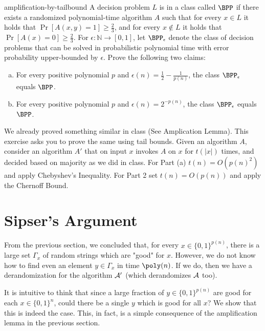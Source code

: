 \begin{exercise-prob}
\begin{show-ps1}{amplification-by-tailbound}
A decision problem $L$ is in a class called $\BPP$ if there exists a randomized polynomial-time algorithm $A$ such that for every $x \in L$ it holds that $\Pr[A(x,y) = 1] \ge \frac{2}{3}$, and for every $x \notin L$ it holds that $\Pr[A(x) = 0] \ge \frac{2}{3}$. For $\epsilon : \mathbb{N} \to [0,1]$, let $\BPP_{\epsilon}$ denote the class of decision problems that can be solved in probabilistic polynomial time with error probability upper-bounded by $\epsilon$. Prove the following two claims:
\begin{enumerate}[(a)]
\item 
For every positive polynomial $p$ and $\epsilon(n) = \frac{1}{2}-\frac{1}{p(n)}$, 
the class $\BPP_{\epsilon}$ equals $\BPP$.
\item For every positive polynomial $p$ and $\epsilon(n) = 2^{-p(n)}$, 
the class $\BPP_\epsilon$ equals $\BPP$.
\end{enumerate}
We already proved something similar in class (See Amplication Lemma). This exercise asks you to prove the same using tail bounds. Given an algorithm $A$, consider an algorithm $A'$ that on input $x$ invokes $A$ on $x$ for $t(|x|)$ times, and decided based on majority as we did in class. For Part (a) $t(n) = O(p(n)^2)$ and apply Chebyshev’s Inequality. For Part 2 set $t(n) = O(p(n))$ and apply the Chernoff Bound.
\end{show-ps1}
\end{exercise-prob}


\section{Sipser's Argument}

From the previous section, we concluded that, for every $x \in \{0,1\}^{p(n)}$, there is a large set $\Gamma_x$ of random strings which are "good" for $x$. However, we do not know how to find even an element $y \in \Gamma_x$ in time $\poly(n)$. If we do, then we have a derandomization for the algorithm ${\cal{A'}}$ (which derandomizes ${\cal{A}}$ too).

It is intuitive to think that since a large fraction of $y \in \{0,1\}^{p(n)}$ are good for each $x \in \{0,1\}^n$, could there be a single $y$ which is good for all $x$? We show that this is indeed the case. This, in fact, is a simple consequence of the amplification lemma in the previous section.

